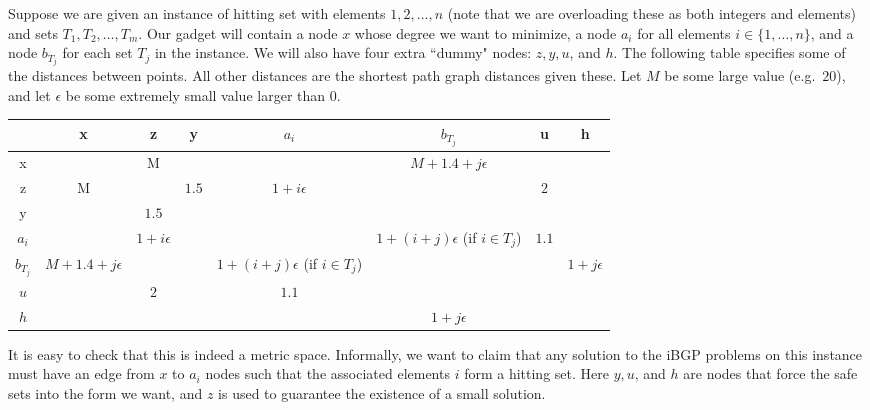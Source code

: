 \documentclass[11pt,letterpaper]{article}
\theoremstyle{definition}
\newcounter{note}[section]
\begin{document}
Suppose we are given an instance of hitting set with elements $1,2,
\dots, n$ (note that we are overloading these as both integers and
elements) and sets $T_1, T_2, \dots, T_{m}$.  Our gadget will contain
a node $x$ whose degree we want to minimize, a node $a_i$ for all
elements $i \in \{1,\dots, n\}$, and a node $b_{T_j}$ for each set
$T_j$ in the instance.  We will also have four extra ``dummy" nodes:
$z,y,u$, and $h$.  The following table specifies some of the distances
between points.  All other distances are the shortest path graph
distances given these. Let $M$ be some large value (e.g.~$20$), and let $\epsilon$
be some extremely small value larger than $0$.

\begin{center}
\begin{tabular}{c|ccccccc}
 & x & z & y & $a_i$ & $b_{T_j}$ & u & h \\
\hline
x &  & M &  &  & $M+ 1.4 + j\epsilon$ & &  \\
z & M & &  $1.5$ & $1+i\epsilon$ &  & $2$ &  \\
y & & $1.5$ & & \\
$a_i$ & & $1+i\epsilon$& & & $1+(i+j)\epsilon$ (if $i \in T_j$) & $1.1$&  \\
$b_{T_j}$ & $M +1.4 + j\epsilon$ & & & $1+(i+j)\epsilon$ (if $i \in T_j$) & & & $1+j\epsilon$ \\
$u$ & & $2$ & & $1.1$\\
$h$ &  & & & & $1+j\epsilon$
\end{tabular}
\end{center}

It is easy to check that this is indeed a metric space.  Informally,
we want to claim that any solution to the iBGP problems on this
instance must have an edge from $x$ to $a_i$ nodes such that the
associated elements $i$ form a hitting set.  Here $y,u$, and $h$ are nodes that force the safe sets into the form we want, and $z$ is used to guarantee the existence of a small solution.
\end{document}
